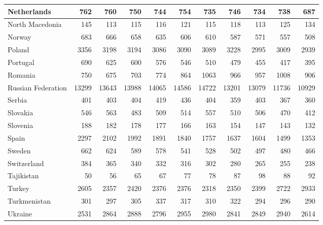 \begin{table}
\begin{tabular}{|l|r|r|r|r|r|r|r|r|r|r|}
                   Netherlands&    762&    760&    750&    744&    754&    735&    746&    734&    738&    687\\\hline
               North Macedonia&    145&    113&    115&    116&    121&    115&    118&    113&    125&    134\\\hline
                        Norway&    683&    666&    658&    635&    606&    610&    587&    571&    557&    508\\\hline
                        Poland&   3356&   3198&   3194&   3086&   3090&   3089&   3228&   2995&   3009&   2939\\\hline
                      Portugal&    690&    625&    600&    576&    546&    510&    479&    455&    417&    395\\\hline
                       Romania&    750&    675&    703&    774&    864&   1063&    966&    957&   1008&    906\\\hline
            Russian Federation&  13299&  13643&  13988&  14065&  14586&  14722&  13201&  13079&  11736&  10929\\\hline
                        Serbia&    401&    403&    404&    419&    436&    404&    359&    403&    367&    360\\\hline
                      Slovakia&    546&    563&    483&    509&    514&    557&    510&    506&    470&    412\\\hline
                      Slovenia&    188&    182&    178&    177&    166&    163&    154&    147&    143&    132\\\hline
                         Spain&   2297&   2102&   1992&   1891&   1840&   1757&   1637&   1604&   1499&   1353\\\hline
                        Sweden&    662&    624&    589&    578&    541&    528&    502&    497&    480&    466\\\hline
                   Switzerland&    384&    365&    340&    332&    316&    302&    280&    265&    255&    238\\\hline
                    Tajikistan&     50&     56&     65&     67&     77&     78&     87&     98&     88&     92\\\hline
                        Turkey&   2605&   2357&   2420&   2376&   2376&   2318&   2350&   2399&   2722&   2933\\\hline
                  Turkmenistan&    301&    297&    305&    337&    317&    310&    322&    294&    296&    290\\\hline
                       Ukraine&   2531&   2864&   2888&   2796&   2955&   2980&   2841&   2849&   2940&   2614\\\hline

\end{tabular}
\end{table}
